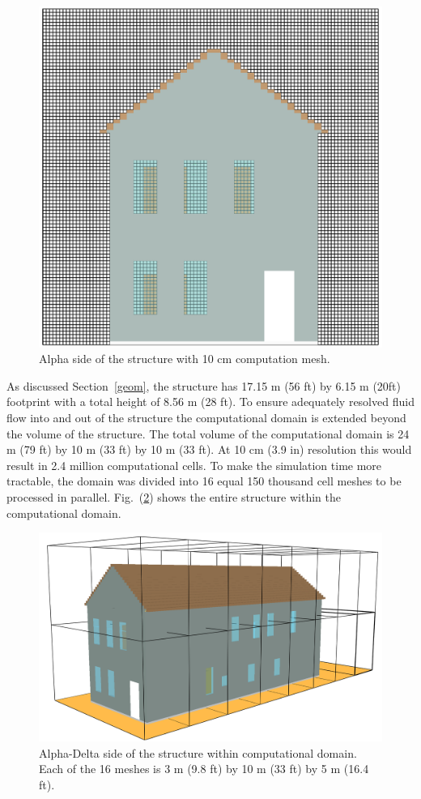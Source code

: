 \documentclass[11pt,oneside]{book}
\begin{document}
\begin{figure}[h!]
\centering
\includegraphics[width=.60\textwidth]{../Figures/smv_exterior_grid}
\caption{Alpha side of the structure with 10 cm computation mesh.}
\label{fig:geom_grid}
\end{figure}

As discussed Section~\ref{geom}, the structure has 17.15 m (56 ft) by 6.15 m (20ft) footprint with a total height of 8.56 m (28 ft). To ensure adequately resolved fluid flow into and out of the structure the computational domain is extended beyond the volume of the structure. The total volume of the computational domain is 24 m (79 ft) by 10 m (33 ft) by 10 m (33 ft). At 10 cm (3.9 in) resolution this would result in 2.4 million computational cells. To make the simulation time more tractable, the domain was divided into 16 equal 150 thousand cell meshes to be processed in parallel. Fig.~(\ref{fig:mult_mesh}) shows the entire structure within the computational domain.

\begin{figure}[h!]
\centering
\includegraphics[width=.60\textwidth]{../Figures/smv_exterior_mesh}
\caption{Alpha-Delta side of the structure within computational domain. Each of the 16 meshes is 3 m (9.8 ft) by 10 m (33 ft) by 5 m (16.4 ft).}
\label{fig:mult_mesh}
\end{figure}
\end{document}
